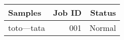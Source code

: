 \begin{table}[ht]
\centering
\begin{tabular}{l|r|r}
Samples & Job ID & Status \\\hline
toto---tata & 001 & Normal \\
\end{tabular}
\end{table}
